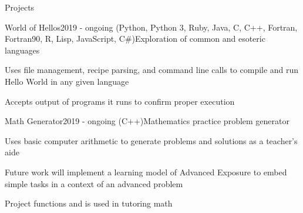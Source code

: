 \documentclass{resume} %
\begin{document}
\begin{rSection}{Projects} \vspace{-0.25em}


\begin{rWorkSubsection}{World of Hellos}{2019 - ongoing (Python, Python 3, Ruby, Java, C, C++, Fortran, Fortran90, R, Lisp, JavaScript, C\#)}{Exploration of common and esoteric languages}{}
\item Uses file management, recipe parsing, and command line calls to compile and run Hello World in any given language
\item Accepts output of programs it runs to confirm proper execution
\end{rWorkSubsection}\vspace{-0.5em}

\iffalse
\begin{rWorkSubsection}{j-elliot.github.io}{2019 - ongoing (HTML, CSS)}{Personal Website}{}
\item Showcases projects and Curiculum Vitea information as well as personal philosophy
\item Includes a sexy calendar
\end{rWorkSubsection}\vspace{-0.5em}
\fi

\begin{rWorkSubsection}{Math Generator}{2019 - ongoing (C++)}{Mathematics practice problem generator}{}
\item Uses basic computer arithmetic to generate problems and solutions as a teacher's aide
\item Future work will implement a learning model of Advanced Exposure to embed simple tasks in a context of an advanced problem
\item Project functions and is used in tutoring math
\end{rWorkSubsection}\vspace{-0.5em}

\iffalse
\begin{rWorkSubsection}{The Borden Manor}{2019 - ongoing}{Restoration of a local architectural icon}{}
\item Consulting contractor in the restoration and refurbishment of a nineteenth century Victorian ch\^{a}teau
\item Oversees electrical and plumbing systems maintenance and development
\item Assists in steampunk aesthetic design realization
\item Assists in  reduce, reuse, recycle focused design
\item Drafted whole house floor plans in AutoCAD along with grounds layout
\end{rWorkSubsection}\vspace{-0.5em}
\fi


\end{rSection}
\end{document}
